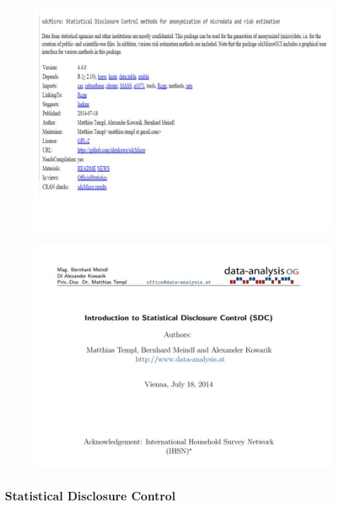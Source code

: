 \documentclass{beamer}
\begin{document}
\begin{frame}
\begin{figure}
\centering
\includegraphics[width=1.1\linewidth]{./JPEGS/Slide3}

\end{figure}
\end{frame}
\begin{frame}
\begin{figure}
\centering
\includegraphics[width=1.1\linewidth]{./JPEGS/Slide4}
\end{figure}
\end{frame}
%
%
%
%
%
%
\begin{frame}
\frametitle{Statistical Disclosure Control}

\end{frame}
\end{document}
